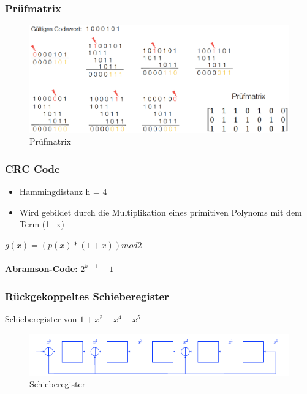 \subsubsection{Prüfmatrix}
\begin{figure}[h!]
	\centering
	\begin{minipage}[t]{0.9\textwidth}
		\centering
		\includegraphics[width=0.9\linewidth]{images/pruefmatrix}
		\caption{Prüfmatrix}
		\label{fig:pruefmatrix}
	\end{minipage}
\end{figure}

\subsubsection{CRC Code}
\begin{itemize}
	\item Hammingdistanz h = 4
	\item Wird gebildet durch die Multiplikation eines primitiven Polynoms mit dem Term (1+x)
\end{itemize}
$g(x)=(p(x)*(1+x))mod2$ \\
\\
\textbf{Abramson-Code:} $2^{k-1}-1$

\subsubsection{Rückgekoppeltes Schieberegister}
Schieberegister von $1+x^2+x^4+x^5$
\begin{figure}[h!]
	\centering
	\begin{minipage}[t]{0.7\textwidth}
		\centering
		\includegraphics[width=0.9\linewidth]{images/schieberegister}
		\caption{Schieberegister}
		\label{fig:schieberegister}
	\end{minipage}
\end{figure}
\clearpage

